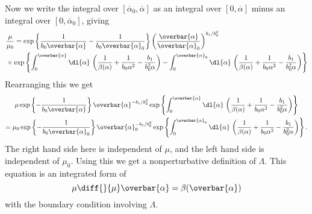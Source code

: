 \documentclass[fleqn]{NotesClass}
\begin{document}
    Now we write the integral over \([\overbar{\alpha}_0, \overbar{\alpha}]\) as an integral over \([0, \overbar{\alpha}]\) minus an integral over \([0, \overbar{\alpha}_0]\), giving
    \begin{align}
        &\frac{\mu}{\mu_0} = \exp\left\{ \frac{1}{b_0\overbar{\alpha}} - \frac{1}{b_0\overbar{\alpha}_0} \right\} \left( \frac{\overbar{\alpha}}{\overbar{\alpha}_0} \right)^{b_1/b_0^2}\\
        &\times  \exp\left\{ \int_0^{\overbar{\alpha}} \dl{\alpha} \, \left( \frac{1}{\beta(\alpha)} + \frac{1}{b_0\alpha^2} - \frac{b_1}{b_0^2\alpha} \right) - \int_{0}^{\overbar{\alpha}_0} \dl{\alpha} \, \left( \frac{1}{\beta(\alpha)} + \frac{1}{b_0\alpha^2} - \frac{b_1}{b_0^2\alpha} \right) \right\} \notag
    \end{align}
    Rearranging this we get
    \begin{multline}
        \mu \exp\left\{ -\frac{1}{b_0\overbar{\alpha}} \right\} \overbar{\alpha}^{-b_1/b_0^2} \exp\left\{ \int_0^{\overbar{\alpha}} \dl{\alpha} \, \left( \frac{1}{\beta(\alpha)} + \frac{1}{b_0\alpha^2} - \frac{b_1}{b_0^2\alpha} \right) \right\}\\
        = \mu_0 \exp\left\{ -\frac{1}{b_0\overbar{\alpha}_0} \right\} \overbar{\alpha}_0^{-b_1/b_0^2} \exp\left\{ \int_0^{\overbar{\alpha}_0} \dl{\alpha} \, \left( \frac{1}{\beta(\alpha)} + \frac{1}{b_0\alpha^2} - \frac{b_1}{b_0^2\alpha} \right) \right\}.
    \end{multline}
    The right hand side here is independent of \(\mu\), and the left hand side is independent of \(\mu_0\).
    Using this we get a nonperturbative definition of \(\Lambda\).
    This equation is an integrated form of
    \begin{equation}
        \mu \diff{}{\mu} \overbar{\alpha} = \beta(\overbar{\alpha})
    \end{equation}
    with the boundary condition involving \(\Lambda\).
    
\end{document}
